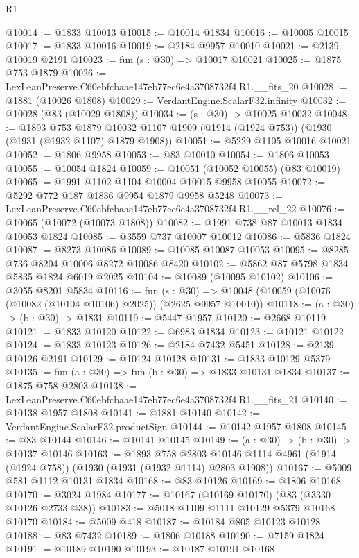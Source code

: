 \begin{lexlean}{R1}
\begin{coremodule}
@10014 := @1833 @10013
@10015 := @10014 @1834
@10016 := @10005 @10015
@10017 := @1833 @10016
@10019 := @2184 @9957 @10010
@10021 := @2139 @10019 @2191
@10023 := fun (s : @30) => @10017 @10021
@10025 := @1875 @753 @1879
@10026 := LexLeanPreserve.C60ebfcbaae147eb77ec6e4a3708732f4.R1.__fits_20
@10028 := @1881 (@10026 @1808)
@10029 := VerdantEngine.ScalarF32.infinity
@10032 := @10028 (@83 (@10029 @1808))
@10034 := (s : @30) -> @10025 @10032
@10048 := @1893
    @753
    @1879
    @10032
    @1107
    @1909
    (@1914 (@1924 @753))
    (@1930 (@1931 (@1932 @1107) @1879 @1908))
@10051 := @5229 @1105 @10016 @10021
@10052 := @1806 @9958
@10053 := @83 @10010
@10054 := @1806 @10053
@10055 := @10054 @1824
@10059 := @10051 (@10052 @10055) (@83 @10019)
@10065 := @1991 @1102 @1104 @10004 @10015 @9958 @10055
@10072 := @5292 @772 @187 @1836 @9954 @1879 @9958 @5248
@10073 := LexLeanPreserve.C60ebfcbaae147eb77ec6e4a3708732f4.R1.__rel_22
@10076 := @10065 (@10072 (@10073 @1808))
@10082 := @1991 @738 @87 @10013 @1834 @10053 @1824
@10085 := @3559 @737 @10007 @10012
@10086 := @5836 @1824
@10087 := @8273 @10086
@10089 := @10085 @10087 @10053
@10095 := @8285 @736 @8204 @10006 @8272 @10086 @8420
@10102 := @5862 @87 @5798 @1834 @5835 @1824 @6019 @2025
@10104 := @10089 (@10095 @10102)
@10106 := @3055 @8201 @5834
@10116 := fun (s : @30) =>
  @10048 (@10059 (@10076 (@10082 (@10104 @10106) @2025)) (@2625 @9957 @10010))
@10118 := (a : @30) -> (b : @30) -> @1831
@10119 := @5447 @1957
@10120 := @2668 @10119
@10121 := @1833 @10120
@10122 := @6983 @1834
@10123 := @10121 @10122
@10124 := @1833 @10123
@10126 := @2184 @7432 @5451
@10128 := @2139 @10126 @2191
@10129 := @10124 @10128
@10131 := @1833 @10129 @5379
@10135 := fun (a : @30) => fun (b : @30) => @1833 @10131 @1834
@10137 := @1875 @758 @2803
@10138 := LexLeanPreserve.C60ebfcbaae147eb77ec6e4a3708732f4.R1.__fits_21
@10140 := @10138 @1957 @1808
@10141 := @1881 @10140
@10142 := VerdantEngine.ScalarF32.productSign
@10144 := @10142 @1957 @1808
@10145 := @83 @10144
@10146 := @10141 @10145
@10149 := (a : @30) -> (b : @30) -> @10137 @10146
@10163 := @1893
    @758
    @2803
    @10146
    @1114
    @4961
    (@1914 (@1924 @758))
    (@1930 (@1931 (@1932 @1114) @2803 @1908))
@10167 := @5009 @581 @1112 @10131 @1834
@10168 := @83 @10126
@10169 := @1806 @10168
@10170 := @3024 @1984
@10177 := @10167 (@10169 @10170) (@83 (@3330 @10126 @2733 @38))
@10183 := @5018 @1109 @1111 @10129 @5379 @10168 @10170
@10184 := @5009 @418
@10187 := @10184 @805 @10123 @10128
@10188 := @83 @7432
@10189 := @1806 @10188
@10190 := @7159 @1824
@10191 := @10189 @10190
@10193 := @10187 @10191 @10168

\end{coremodule}
\end{lexlean}
